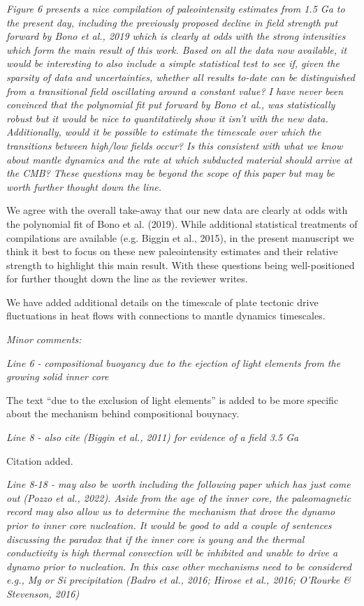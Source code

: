 \documentclass[11pt, letterpaper]{article}
\begin{document}
\begin{flushleft}
\itshape
Figure 6 presents a nice compilation of paleointensity estimates from 1.5 Ga to the present day, including the previously proposed decline in field strength put forward by Bono et al., 2019 which is clearly at odds with the strong intensities which form the main result of this work. Based on all the data now available, it would be interesting to also include a simple statistical test to see if, given the sparsity of data and uncertainties, whether all results to-date can be distinguished from a transitional field oscillating around a constant value? I have never been convinced that the polynomial fit put forward by Bono et al., was statistically robust but it would be nice to quantitatively show it isn't with the new data. Additionally, would it be possible to estimate the timescale over which the transitions between high/low fields occur? Is this consistent with what we know about mantle dynamics and the rate at which subducted material should arrive at the CMB? These questions may be beyond the scope of this paper but may be worth further thought down the line.
\upshape

We agree with the overall take-away that our new data are clearly at odds with the polynomial fit of Bono et al. (2019). While additional statistical treatments of compilations are available (e.g. Biggin et al., 2015), in the present manuscript we think it best to focus on these new paleointensity estimates and their relative strength to highlight this main result. With these questions being well-positioned for further thought down the line as the reviewer writes.

We have added additional details on the timescale of plate tectonic drive fluctuations in heat flows with connections to mantle dynamics timescales.


\itshape
Minor comments:
\upshape

\textit{Line 6 - compositional buoyancy due to the ejection of light elements from the growing solid inner core}

The text ``due to the exclusion of light elements'' is added to be more specific about the mechanism behind compositional bouynacy.

\textit{Line 8 - also cite (Biggin et al., 2011) for evidence of a field 3.5 Ga}

Citation added. 

\textit{Line 8-18 - may also be worth including the following paper which has just come out (Pozzo et al., 2022). Aside from the age of the inner core, the paleomagnetic record may also allow us to determine the mechanism that drove the dynamo prior to inner core nucleation. It would be good to add a couple of sentences discussing the paradox that if the inner core is young and the thermal conductivity is high thermal convection will be inhibited and unable to drive a dynamo prior to nucleation. In this case other mechanisms need to be considered e.g., Mg or Si precipitation (Badro et al., 2016; Hirose et al., 2016; O'Rourke \& Stevenson, 2016)}


\end{flushleft}
\end{document}
